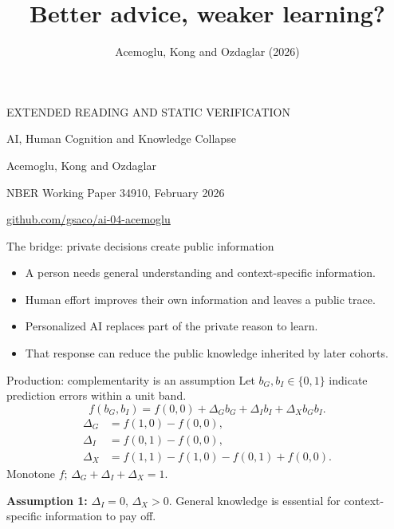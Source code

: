 \documentclass[11pt,aspectratio=169]{beamer}
\title{Better advice, weaker learning?}
\author{Acemoglu, Kong and Ozdaglar (2026)}
\begin{document}
\begin{frame}
\vspace{5mm}
{\color{Accent}\small EXTENDED READING AND STATIC VERIFICATION}\par\bigskip
{\inserttitle}\par\medskip
{\large AI, Human Cognition and Knowledge Collapse}\par\bigskip
Acemoglu, Kong and Ozdaglar\par
NBER Working Paper 34910, February 2026\par\bigskip
\href{https://github.com/gsaco/ai-04-acemoglu}{\textcolor{Accent}{github.com/gsaco/ai-04-acemoglu}}
\end{frame}

\begin{frame}{The bridge: private decisions create public information}
\begin{itemize}\setlength\itemsep{4mm}
\item A person needs general understanding and context-specific information.
\item Human effort improves their own information and leaves a public trace.
\item Personalized AI replaces part of the private reason to learn.
\item That response can reduce the public knowledge inherited by later cohorts.
\end{itemize}
\end{frame}

\begin{frame}{Production: complementarity is an assumption}
Let $b_G,b_I\in\{0,1\}$ indicate prediction errors within a unit band.
\[
 f(b_G,b_I)=f(0,0)+\Delta_G b_G+\Delta_I b_I+\Delta_X b_Gb_I.
\]
\[
\begin{aligned}
\Delta_G&=f(1,0)-f(0,0),\\
\Delta_I&=f(0,1)-f(0,0),\\
\Delta_X&=f(1,1)-f(1,0)-f(0,1)+f(0,0).
\end{aligned}
\]
Monotone $f$; $\Delta_G+\Delta_I+\Delta_X=1$.
\medskip

\textbf{Assumption 1:} $\Delta_I=0$, $\Delta_X>0$.
General knowledge is essential for context-specific information to pay off.
\end{frame}
\end{document}
